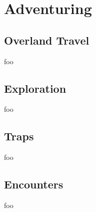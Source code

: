 \chapter{Adventuring}
\section{Overland Travel}
foo
\section{Exploration}
foo
\section{Traps}
foo
\section{Encounters}
foo